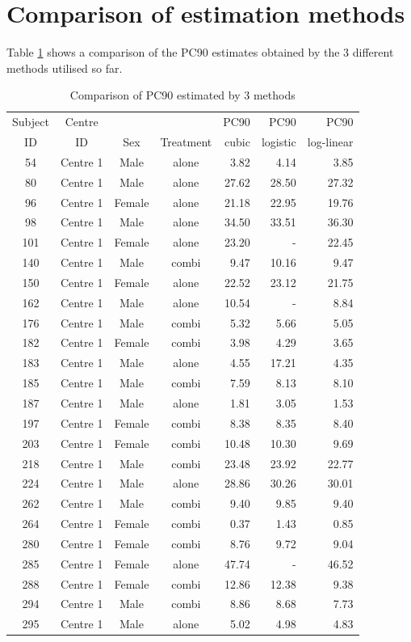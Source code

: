 \section{Comparison of estimation methods}
Table \ref{PC90} shows a comparison of the PC90 estimates obtained by the 3 different methods utilised so far.
\begin{table}[p]
\centering
\caption{Comparison of PC90 estimated by 3 methods}\label{PC90}
\begin{tabular}{|cccc|rrr|}
\hline
Subject&Centre&&&PC90&PC90&PC90\\
ID&ID&Sex&Treatment&cubic&logistic&log-linear\\
\hline
54&Centre 1&Male&alone&3.82&4.14&3.85\\
80&Centre 1&Male&alone&27.62&28.50&27.32\\
96&Centre 1&Female&alone&21.18&22.95&19.76\\
98&Centre 1&Male&alone&34.50&33.51&36.30\\
101&Centre 1&Female&alone&23.20&-&22.45\\
140&Centre 1&Male&combi&9.47&10.16&9.47\\
150&Centre 1&Female&alone&22.52&23.12&21.75\\
162&Centre 1&Male&alone&10.54&-&8.84\\
176&Centre 1&Male&combi&5.32&5.66&5.05\\
182&Centre 1&Female&combi&3.98&4.29&3.65\\
183&Centre 1&Male&alone&4.55&17.21&4.35\\
185&Centre 1&Male&combi&7.59&8.13&8.10\\
187&Centre 1&Male&alone&1.81&3.05&1.53\\
197&Centre 1&Female&combi&8.38&8.35&8.40\\
203&Centre 1&Female&combi&10.48&10.30&9.69\\
218&Centre 1&Male&combi&23.48&23.92&22.77\\
224&Centre 1&Male&alone&28.86&30.26&30.01\\
262&Centre 1&Male&combi&9.40&9.85&9.40\\
264&Centre 1&Female&combi&0.37&1.43&0.85\\
280&Centre 1&Female&combi&8.76&9.72&9.04\\
285&Centre 1&Female&alone&47.74&-&46.52\\
288&Centre 1&Female&combi&12.86&12.38&9.38\\
294&Centre 1&Male&combi&8.86&8.68&7.73\\
295&Centre 1&Male&alone&5.02&4.98&4.83\\

\end{tabular}
\end{table}
